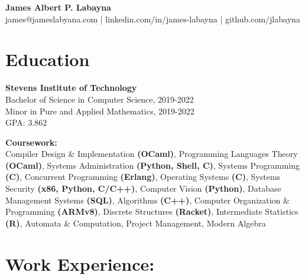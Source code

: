 \documentclass[10pt,letterpaper]{article}
\begin{document}
  \begin{center}
    \textbf{James Albert P. Labayna} \\
    \small james@jameslabyana.com | linkedin.com/in/james-labayna | github.com/jlabayna
  \end{center}
  
  \iffalse
  \begin{minipage}[t]{2in}
    \textbf{Present Address:} \\
    205 Hudson St, Apt. 602 \\
    Hoboken, NJ 07030 \\
    201.256.7526
  \end{minipage}
  \hfill
  \begin{minipage}[t]{2.4in}
    \textbf{Permanent Address:} \\
    294 S. Washington Ave., Apt. 87 \\
    Bergenfield, NJ 07030
  \end{minipage}
  \fi
  
  \section{Education}
    \textbf{Stevens Institute of Technology} \\
    Bachelor of Science in Computer Science, 2019-2022 \\
    Minor in Pure and Applied Mathematics, 2019-2022 \\
    GPA: 3.862
    
    \noindent\textbf{Coursework:}\\
    Compiler Design \& Implementation \textbf{(OCaml)},
    Programming Languages Theory \textbf{(OCaml)},
    Systems Administration \textbf{(Python, Shell, C)},
    Systems Programming \textbf{(C)},
    Concurrent Programming \textbf{(Erlang)},
    Operating Systems \textbf{(C)},
    Systems Security \textbf{(x86, Python, C/C++)},
    Computer Vision \textbf{(Python)},
    Database Management Systems \textbf{(SQL)},
    Algorithms \textbf{(C++)},
    Computer Organization \& Programming \textbf{(ARMv8)},
    Discrete Structures \textbf{(Racket)},
    Intermediate Statistics \textbf{(R)},
    Automata \& Computation,
    Project Management,
    Modern Algebra
   
  \section{Work Experience:}
	
\end{document}
